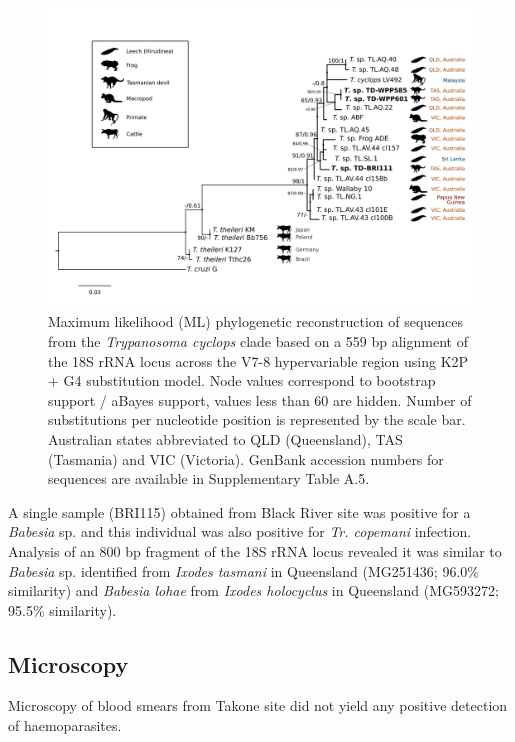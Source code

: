 \documentclass[a4paper, nobind]{templates/ociamthesis}
\begin{document}
\begin{figure}
\includegraphics[width=0.95\linewidth]{figures/ms-figs/Ch6-Fig4} \caption[Phylogenetic tree of \textit{Tr. cyclops} clade (\textit{18S rRNA}, v7-8 region) from the Tasmanian devil.]{Maximum likelihood (ML) phylogenetic reconstruction of sequences from the \textit{Trypanosoma cyclops} clade based on a 559 bp alignment of the 18S rRNA locus across the V7-8 hypervariable region using K2P + G4 substitution model. Node values correspond to bootstrap support / aBayes support, values less than 60 are hidden. Number of substitutions per nucleotide position is represented by the scale bar. Australian states abbreviated to QLD (Queensland), TAS (Tasmania) and VIC (Victoria). GenBank accession numbers for sequences are available in Supplementary Table A.5.}\label{fig:F64}
\end{figure}

A single sample (BRI115) obtained from Black River site was positive for a \emph{Babesia} sp. and this individual was also positive for \emph{Tr. copemani} infection. Analysis of an 800 bp fragment of the 18S rRNA locus revealed it was similar to \emph{Babesia} sp. identified from \emph{Ixodes tasmani} in Queensland (MG251436; 96.0\% similarity) and \emph{Babesia lohae} from \emph{Ixodes holocyclus} in Queensland (MG593272; 95.5\% similarity).

\hypertarget{microscopy}{%
\subsection{Microscopy}\label{microscopy}}

Microscopy of blood smears from Takone site did not yield any positive detection of haemoparasites.
\end{document}
